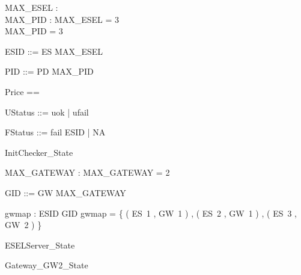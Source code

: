 \documentclass{article}
\begin{document}

\begin{axdef}
	MAX\_ESEL : \nat \\
 MAX\_PID : \nat 
\where
 MAX\_ESEL = 3 \\
 MAX\_PID = 3
\end{axdef}

\begin{zed}
	ESID ::= ES  \upto MAX\_ESEL \rdata
\end{zed}

\begin{zed}
	PID ::= PD  \upto MAX\_PID \rdata
\end{zed}

\begin{zed}
	Price == \nat
\end{zed}

\begin{zed}
	UStatus ::= uok | ufail
\end{zed}

\begin{zed}
	FStatus ::= fail \ldata ESID \rdata | NA
\end{zed}

\begin{zed}
	InitChecker\_State 
\end{zed}

\begin{axdef}
	MAX\_GATEWAY : \nat 
\where
 MAX\_GATEWAY = 2
\end{axdef}

\begin{zed}
	GID ::= GW  \upto MAX\_GATEWAY \rdata
\end{zed}

\begin{axdef}
	gwmap : ESID \fun GID 
\where
 gwmap = \{ ( ES~1 , GW~1 ) , ( ES~2 , GW~1 ) , ( ES~3 , GW~2 ) \}
\end{axdef}

\begin{zed}
	ESELServer\_State 
\end{zed}

\begin{zed}
	Gateway\_GW2\_State 
\end{zed}
\end{document}
